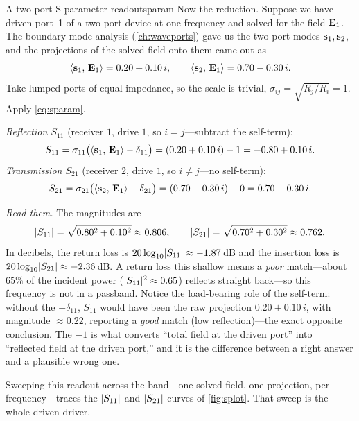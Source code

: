\begin{workedexample}{A two-port S-parameter readout}{sparam}
Now the reduction. Suppose we have driven port~1 of a two-port device at one
frequency and solved for the field $\mathbf{E}_1$. The boundary-mode analysis
(\cref{ch:waveports}) gave us the two port modes $\mathbf{s}_1,\mathbf{s}_2$, and the projections
of the solved field onto them came out as
\[
  \left\langle \mathbf{s}_1,\, \mathbf{E}_1\right\rangle = 0.20 + 0.10\,i,
  \qquad
  \left\langle \mathbf{s}_2,\, \mathbf{E}_1\right\rangle = 0.70 - 0.30\,i.
\]
Take lumped ports of equal impedance, so the scale is trivial,
$\sigma_{ij} = \sqrt{R_j/R_i} = 1$. Apply \cref{eq:sparam}.

\medskip
\emph{Reflection $S_{11}$} (receiver $1$, drive $1$, so $i=j$---subtract the
self-term):
\[
  S_{11}
    = \sigma_{11}\bigl(\left\langle \mathbf{s}_1,\, \mathbf{E}_1\right\rangle - \delta_{11}\bigr)
    = (0.20 + 0.10\,i) - 1
    = -0.80 + 0.10\,i.
\]
\emph{Transmission $S_{21}$} (receiver $2$, drive $1$, so $i\neq j$---no
self-term):
\[
  S_{21}
    = \sigma_{21}\bigl(\left\langle \mathbf{s}_2,\, \mathbf{E}_1\right\rangle - \delta_{21}\bigr)
    = (0.70 - 0.30\,i) - 0
    = 0.70 - 0.30\,i.
\]

\medskip
\emph{Read them.} The magnitudes are
\[
  \lvert S_{11}\rvert = \sqrt{0.80^2 + 0.10^2} \approx 0.806,
  \qquad
  \lvert S_{21}\rvert = \sqrt{0.70^2 + 0.30^2} \approx 0.762.
\]
In decibels, the return loss is
$20\log_{10}\lvert S_{11}\rvert \approx -1.87\,$dB and the insertion loss is
$20\log_{10}\lvert S_{21}\rvert \approx -2.36\,$dB. A return loss this shallow means a
\emph{poor} match---about $65\%$ of the incident power
($\lvert S_{11}\rvert^2 \approx 0.65$) reflects straight back---so this frequency is not
in a passband. Notice the load-bearing role of the self-term: without the
$-\delta_{11}$, $S_{11}$ would have been the raw projection $0.20+0.10\,i$, with
magnitude $\approx 0.22$, reporting a \emph{good} match (low reflection)---the
exact opposite conclusion. The $-1$ is what converts ``total field at the driven
port'' into ``reflected field at the driven port,'' and it is the difference
between a right answer and a plausible wrong one.

\medskip
Sweeping this readout across the band---one solved field, one projection, per
frequency---traces the $\lvert S_{11}\rvert$ and $\lvert S_{21}\rvert$ curves of
\cref{fig:splot}. That sweep is the whole driven driver.
\end{workedexample}

